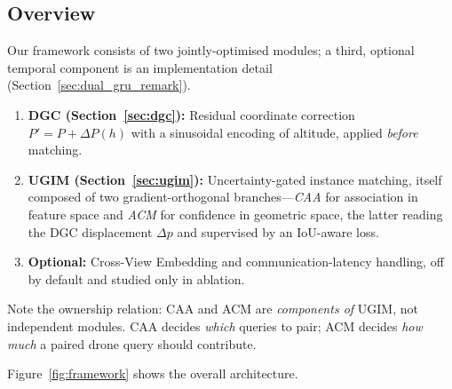\documentclass[9.5pt,twocolumn,a4paper]{IEEEtran}
\begin{document}
\subsection{Overview}

Our framework consists of two jointly-optimised modules; a third, optional temporal component is an implementation detail (Section~\ref{sec:dual_gru_remark}).

\begin{enumerate}
    \item \textbf{DGC (Section~\ref{sec:dgc}):} Residual coordinate correction $P' = P + \Delta P(h)$ with a sinusoidal encoding of altitude, applied \emph{before} matching.
    \item \textbf{UGIM (Section~\ref{sec:ugim}):} Uncertainty-gated instance matching, itself composed of two gradient-orthogonal branches---\emph{CAA} for association in feature space and \emph{ACM} for confidence in geometric space, the latter reading the DGC displacement $\Delta p$ and supervised by an IoU-aware loss.
    \item \textbf{Optional:} Cross-View Embedding and communication-latency handling, off by default and studied only in ablation.
\end{enumerate}

\noindent Note the ownership relation: CAA and ACM are \emph{components of} UGIM, not independent modules. CAA decides \emph{which} queries to pair; ACM decides \emph{how much} a paired drone query should contribute.

Figure~\ref{fig:framework} shows the overall architecture.
\end{document}
